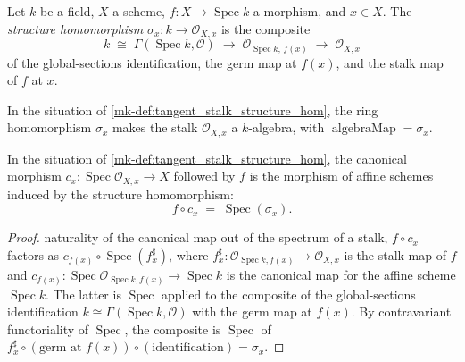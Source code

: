 \begin{definition}\label{mk-def:tangent_stalk_structure_hom}
  \leanok

  Let \(k\) be a field, \(X\) a scheme, \(f : X \to \operatorname{Spec} k\)
  a morphism, and \(x \in X\). The \emph{structure homomorphism}
  \(\sigma_x : k \to \mathcal O_{X,x}\) is the composite
  \[
    k \;\cong\; \Gamma(\operatorname{Spec} k, \mathcal O)
      \;\longrightarrow\; \mathcal O_{\operatorname{Spec} k,\, f(x)}
      \;\longrightarrow\; \mathcal O_{X,x}
  \]
  of the global-sections identification, the germ map at \(f(x)\), and
  the stalk map of \(f\) at \(x\).
\end{definition}

\begin{definition}\label{mk-def:tangent_stalk_algebra}
  \leanok

  In the situation of \ref{mk-def:tangent_stalk_structure_hom}, the ring
  homomorphism \(\sigma_x\) makes the stalk \(\mathcal O_{X,x}\) a
  \(k\)-algebra, with \(\operatorname{algebraMap} = \sigma_x\).
\end{definition}

\begin{lemma}\label{mk-lem:tangent_from_spec_stalk_over}
  \leanok

  In the situation of \ref{mk-def:tangent_stalk_structure_hom}, the
  canonical morphism
  \(c_x : \operatorname{Spec} \mathcal O_{X,x} \to X\) followed by \(f\)
  is the morphism of affine schemes induced by the structure
  homomorphism:
  \[
    f \circ c_x \;=\; \operatorname{Spec}(\sigma_x).
  \]
\end{lemma}

\begin{proof}
  \leanokBy naturality of the canonical map out of the spectrum of a stalk,
  \(f \circ c_x\) factors as
  \(c_{f(x)} \circ \operatorname{Spec}(f^\sharp_x)\), where
  \(f^\sharp_x : \mathcal O_{\operatorname{Spec} k, f(x)} \to \mathcal O_{X,x}\)
  is the stalk map of \(f\) and
  \(c_{f(x)} : \operatorname{Spec} \mathcal O_{\operatorname{Spec} k, f(x)}
  \to \operatorname{Spec} k\) is the canonical map for the affine scheme
  \(\operatorname{Spec} k\). The latter is
  \(\operatorname{Spec}\) applied to the composite of the
  global-sections identification
  \(k \cong \Gamma(\operatorname{Spec} k, \mathcal O)\) with the germ
  map at \(f(x)\). By contravariant functoriality of
  \(\operatorname{Spec}\), the composite is
  \(\operatorname{Spec}\) of
  \(f^\sharp_x \circ (\text{germ at } f(x)) \circ (\text{identification})
  = \sigma_x\).
\end{proof}

